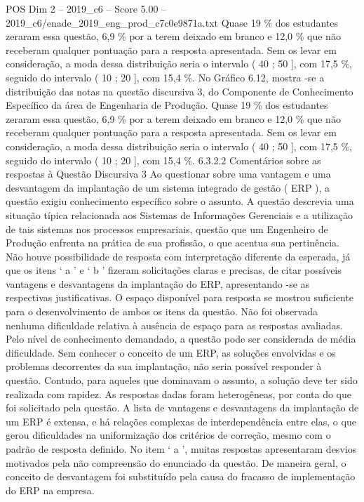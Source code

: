 \begin{textsample}{POS Dim 2 – 2019\_c6 – Score 5.00 – 2019\_c6/enade\_2019\_eng\_prod\_c7c0e9871a.txt}
Quase 19 \% dos estudantes zeraram essa questão, 6,9 \% por a terem deixado em branco e 12,0 \% que não receberam qualquer pontuação para a resposta apresentada.
Sem os levar em consideração, a moda dessa distribuição seria o intervalo ( 40 ; 50 ], com 17,5 \%, seguido do intervalo ( 10 ; 20 ], com 15,4 \%.
No Gráfico 6.12, mostra -se a distribuição das notas na questão discursiva 3, do Componente de Conhecimento Específico da área de Engenharia de Produção.
Quase 19 \% dos estudantes zeraram essa questão, 6,9 \% por a terem deixado em branco e 12,0 \% que não receberam qualquer pontuação para a resposta apresentada.
Sem os levar em consideração, a moda dessa distribuição seria o intervalo ( 40 ; 50 ], com 17,5 \%, seguido do intervalo ( 10 ; 20 ], com 15,4 \%. 6.3.2.2 Comentários sobre as respostas à Questão Discursiva 3 Ao questionar sobre uma vantagem e uma desvantagem da implantação de um sistema integrado de gestão ( ERP ), a questão exigiu conhecimento específico sobre o assunto.
A questão descrevia uma situação típica relacionada aos Sistemas de Informações Gerenciais e a utilização de tais sistemas nos processos empresariais, questão que um Engenheiro de Produção enfrenta na prática de sua profissão, o que acentua sua pertinência.
Não houve possibilidade de resposta com interpretação diferente da esperada, já que os itens ‘ a ’ e ‘ b ’ fizeram solicitações claras e precisas, de citar possíveis vantagens e desvantagens da implantação do ERP, apresentando -se as respectivas justificativas.
O espaço disponível para resposta se mostrou suficiente para o desenvolvimento de ambos os itens da questão.
Não foi observada nenhuma dificuldade relativa à ausência de espaço para as respostas avaliadas.
Pelo nível de conhecimento demandado, a questão pode ser considerada de média dificuldade.
Sem conhecer o conceito de um ERP, as soluções envolvidas e os problemas decorrentes da sua implantação, não seria possível responder à questão.
Contudo, para aqueles que dominavam o assunto, a solução deve ter sido realizada com rapidez.
As respostas dadas foram heterogêneas, por conta do que foi solicitado pela questão.
A lista de vantagens e desvantagens da implantação de um ERP é extensa, e há relações complexas de interdependência entre elas, o que gerou dificuldades na uniformização dos critérios de correção, mesmo com o padrão de resposta definido.
No item ‘ a ’, muitas respostas apresentaram desvios motivados pela não compreensão do enunciado da questão.
De maneira geral, o conceito de desvantagem foi substituído pela causa do fracasso de implementação do ERP na empresa.

\end{textsample}

